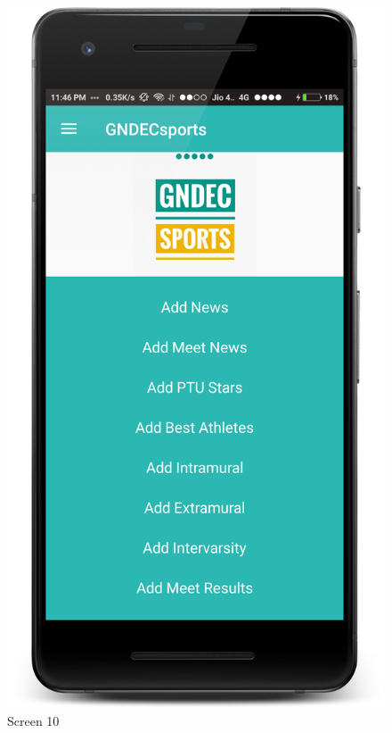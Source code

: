 \begin{figure}[ht]
\centering
\includegraphics[scale=0.13]{images/S10.png}
\caption{Screen 10}
\end{figure}

\newpage


